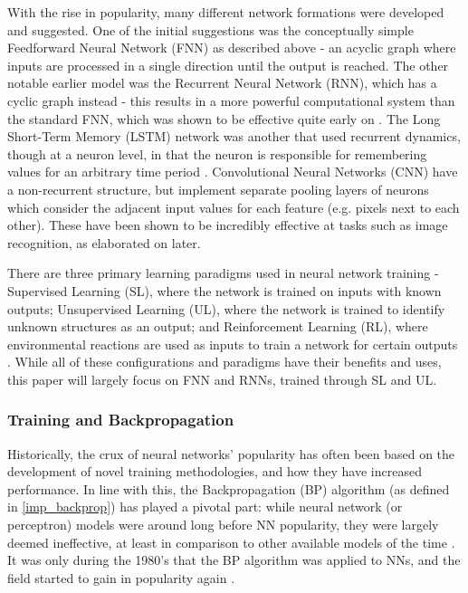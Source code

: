\documentclass[a4paper,latin]{paper}
\begin{document}
With the rise in popularity, many different network formations were developed and suggested. One of the initial 
suggestions was the conceptually simple Feedforward Neural Network (FNN) as described above - an acyclic
 graph where inputs are processed in a single direction until the output is reached. The other notable earlier model 
 was the Recurrent Neural Network (RNN), which has a cyclic graph instead - this results in a more powerful 
 computational system than the standard FNN, which was shown to be effective quite early on 
\cite{Siegelmann}. The Long Short-Term Memory (LSTM) network was 
 another that used recurrent dynamics, though at a neuron level, in that the neuron is responsible for remembering 
 values for an arbitrary time period \cite{Hochreiter}. Convolutional Neural Networks (CNN) have a non-recurrent structure, 
 but implement separate pooling layers of neurons which consider the adjacent input values for each feature 
 (e.g. pixels next to each other). These have been shown to be incredibly effective at tasks such as image 
 recognition, as elaborated on later.
\hfill \break 

There are three primary learning paradigms used in neural network training - Supervised Learning (SL), 
where the network is trained on inputs with known outputs; Unsupervised Learning (UL), where the network is 
trained to identify unknown structures as an output; and Reinforcement Learning (RL), where environmental
reactions are used as inputs to train a network for certain outputs \cite{Schmidhuber}. While all of these configurations and paradigms 
have their benefits and uses, this paper will largely focus on FNN and RNNs, trained through SL and UL.
\hfill \break 

\subsubsection{Training and Backpropagation}\label{lr_trainingbackprop}

Historically, the crux of neural networks’ popularity has often been based on the development of novel training 
methodologies, and how they have increased performance. In line with this, the Backpropagation (BP) algorithm (as defined in \ref{imp_backprop})
has played a pivotal part: while neural network (or perceptron) models were around long before NN popularity, 
they were largely deemed ineffective, at least in comparison to other available models of the time 
\cite{Minksy}. It was only during the 1980’s that the BP algorithm was applied to NNs, and 
the field started to gain in popularity again \cite{LeCun2, Werbos2}. 
\hfill \break 
\end{document}
